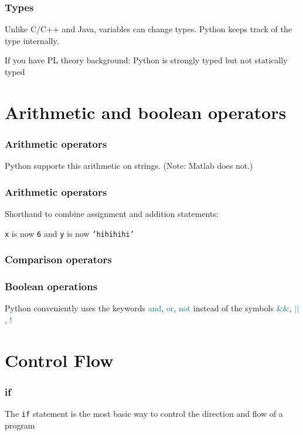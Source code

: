 \documentclass{beamer}
\begin{document}
\begin{frame}
\frametitle{Types}
Unlike C/C++ and Java, variables can change types. Python keeps track of the type internally.


If you have PL theory background: Python is strongly typed but not statically typed

\end{frame}


\section{Arithmetic and boolean operators}

\begin{frame}
\frametitle{Arithmetic operators}



Python supports this arithmetic on strings.  (Note: Matlab does not.)
\end{frame}

\begin{frame}
\frametitle{Arithmetic operators}

Shorthand to combine assignment and addition statements:



\vspace{0.1in}

\texttt{x} is now \texttt{6} and \texttt{y} is now \textcolor{string-color}{\texttt{'hihihihi'}}

\end{frame}


\begin{frame}
\frametitle{Comparison operators}



\end{frame}

\begin{frame}
\frametitle{Boolean operations}



Python conveniently uses the keywords \textcolor{teal}{and}, \textcolor{teal}{or}, \textcolor{teal}{not} instead of the symbols \textcolor{teal}{\&\&}, $\textcolor{teal}{||}$, \textcolor{teal}{!}

\end{frame}

\section{Control Flow}
\begin{frame}
\frametitle{if}
The \texttt{if} statement is the most basic way to control the direction and flow of a program



\end{frame}
\end{document}
